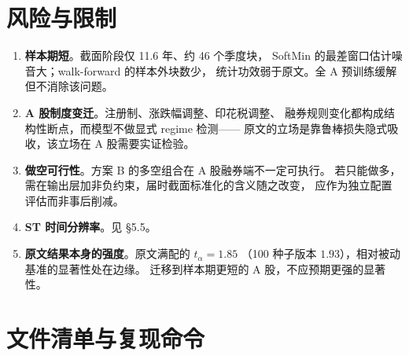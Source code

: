 \documentclass[11pt, a4paper]{ctexart}
\begin{document}
\section{风险与限制}

\begin{enumerate}
  \item \textbf{样本期短}。截面阶段仅 11.6 年、约 46 个季度块，
        SoftMin 的最差窗口估计噪音大；walk-forward 的样本外块数少，
        统计功效弱于原文。全 A 预训练缓解但不消除该问题。
  \item \textbf{A 股制度变迁}。注册制、涨跌幅调整、印花税调整、
        融券规则变化都构成结构性断点，而模型不做显式 regime 检测——
        原文的立场是靠鲁棒损失隐式吸收，该立场在 A 股需要实证检验。
  \item \textbf{做空可行性}。方案 B 的多空组合在 A 股融券端不一定可执行。
        若只能做多，需在输出层加非负约束，届时截面标准化的含义随之改变，
        应作为独立配置评估而非事后削减。
  \item \textbf{ST 时间分辨率}。见 §5.5。
  \item \textbf{原文结果本身的强度}。原文满配的 $t_\alpha = 1.85$
        （100 种子版本 $1.93$），相对被动基准的显著性处在边缘。
        迁移到样本期更短的 A 股，不应预期更强的显著性。
\end{enumerate}

\appendix
\section{文件清单与复现命令}
\end{document}
